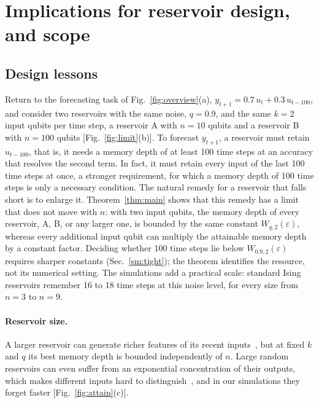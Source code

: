 \documentclass[aps,prl,twocolumn,superscriptaddress,floatfix]{revtex4-2}
\theoremstyle{plain}
\begin{document}
\section{Implications for reservoir design, and scope}
\label{sm:scope}

\subsection{Design lessons}

Return to the forecasting task of Fig.~\ref{fig:overview}(a), $y_{t+1}=0.7\,u_t+0.3\,u_{t-100}$, and consider two reservoirs with the same noise, $q=0.9$, and the same $k=2$ input qubits per time step, a reservoir A with $n=10$ qubits and a reservoir B with $n=100$ qubits [Fig.~\ref{fig:limit}(b)]. To forecast $y_{t+1}$, a reservoir must retain $u_{t-100}$, that is, it needs a memory depth of at least 100 time steps at an accuracy that resolves the second term. In fact, it must retain every input of the last 100 time steps at once, a stronger requirement, for which a memory depth of 100 time steps is only a necessary condition. The natural remedy for a reservoir that falls short is to enlarge it. Theorem~\ref{thm:main} shows that this remedy has a limit that does not move with $n$: with two input qubits, the memory depth of every reservoir, A, B, or any larger one, is bounded by the same constant $W_{q,2}(\varepsilon)$, whereas every additional input qubit can multiply the attainable memory depth by a constant factor. Deciding whether 100 time steps lie below $W_{0.9,2}(\varepsilon)$ requires sharper constants (Sec.~\ref{sm:tight}); the theorem identifies the resource, not its numerical setting. The simulations add a practical scale: standard Ising reservoirs remember 16 to 18 time steps at this noise level, for every size from $n=3$ to $n=9$.

\paragraph*{Reservoir size.} A larger reservoir can generate richer features of its recent inputs~\cite{Nakajima2019}, but at fixed $k$ and $q$ its best memory depth is bounded independently of $n$. Large random reservoirs can even suffer from an exponential concentration of their outputs, which makes different inputs hard to distinguish~\cite{Xiong2025,Dao2026}, and in our simulations they forget faster [Fig.~\ref{fig:attain}(c)].
\end{document}
